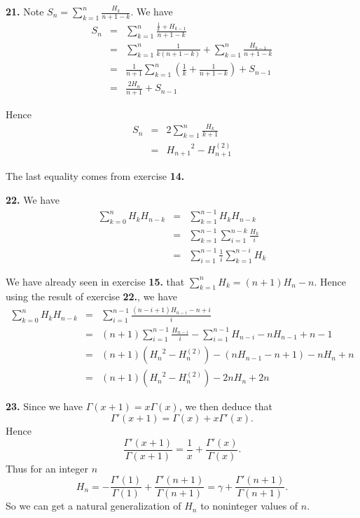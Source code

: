\documentclass[a4paper,12pt]{article}
\newcommand{\newpar}[1]{\bigskip \noindent \textbf{#1.}}
\begin{document}
\newpar{21} Note $S_n = \sum_{k=1}^n \frac{H_k}{n+1-k}$.  We have
\begin{eqnarray*}
  S_n &=& \sum_{k=1}^n \frac{\frac{1}{k} + H_{k-1}}{n+1-k} \\
  &=& \sum_{k=1}^n \frac{1}{k(n+1-k)} +
  \sum_{k=1}^n\frac{H_{k-1}}{n+1-k} \\
  &=& \frac{1}{n+1}\sum_{k=1}^n
  \left(\frac{1}{k}+\frac{1}{n+1-k}\right) + S_{n-1} \\
  &=& \frac{2H_n}{n+1} + S_{n-1}
\end{eqnarray*}

Hence
\begin{eqnarray*}
  S_n &=& 2 \sum_{k=1}^n \frac{H_k}{k+1} \\
  &=& {H_{n+1}}^2 - H_{n+1}^{(2)}
\end{eqnarray*}

The last equality comes from exercise \textbf{14.}

\newpar{22} We have
\begin{eqnarray*}
  \sum_{k=0}^n H_k H_{n-k} &=& \sum_{k=1}^{n-1}H_kH_{n-k} \\
  &=& \sum_{k=1}^{n-1} \sum_{i=1}^{n-k}\frac{H_k}{i} \\
  &=& \sum_{i=1}^{n-1} \frac{1}{i}\sum_{k=1}^{n-i}H_k
\end{eqnarray*}

We have already seen in exercise \textbf{15.} that $\sum_{k=1}^n H_k =
(n+1)H_n - n$.  Hence using the result of exercise \textbf{22.}, we have
\begin{eqnarray*}
  \sum_{k=0}^n H_k H_{n-k} &=&
  \sum_{i=1}^{n-1}\frac{(n-i+1)H_{n-i}-n+i}{i} \\
  &=& (n+1) \sum_{i=1}^{n-1}\frac{H_{n-i}}{i} -
  \sum_{i=1}^{n-1}H_{n-i} - nH_{n-1} + n - 1 \\
  &=& (n+1)({H_n}^2 - H_n^{(2)}) - (nH_{n-1} - n + 1) - nH_n + n
\\
&=& (n+1)({H_n}^2 - H_n^{(2)}) - 2nH_n + 2n
\end{eqnarray*}

\newpar{23} Since we have $\Gamma(x+1) = x\Gamma(x)$, we then deduce
that
\[ \Gamma'(x+1) = \Gamma(x) + x\Gamma'(x).\]
Hence
\[ \frac{\Gamma'(x+1)}{\Gamma(x+1)} = \frac{1}{x} +
\frac{\Gamma'(x)}{\Gamma(x)}.\]
Thus for an integer $n$
\[ H_n = -\frac{\Gamma'(1)}{\Gamma(1)} +
\frac{\Gamma'(n+1)}{\Gamma(n+1)} = \gamma +
\frac{\Gamma'(n+1)}{\Gamma(n+1)}.\]
So we can get a natural generalization of $H_n$ to noninteger values
of $n$.
\end{document}
